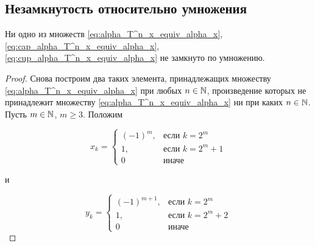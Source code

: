 \subsection{Незамкнутость относительно умножения}

\begin{theorem}
	Ни одно из множеств
	\eqref{eq:alpha_T^n_x_equiv_alpha_x}, \eqref{eq:cap_alpha_T^n_x_equiv_alpha_x}, \eqref{eq:cup_alpha_T^n_x_equiv_alpha_x}
	не замкнуто по умножению.
\end{theorem}

\begin{proof}
	Снова построим два таких элемента, принадлежащих множеству \eqref{eq:alpha_T^n_x_equiv_alpha_x} при любых $n\in\mathbb{N}$,
	произведение которых не принадлежит множеству \eqref{eq:alpha_T^n_x_equiv_alpha_x} ни при каких $n\in\mathbb{N}$.
	Пусть $m\in\mathbb{N}$, $m \geq 3$.
	Положим

	\begin{equation}
		x_k = \begin{cases}
			(-1)^m,  & \mbox{если } k = 2^m     \\
			1,                   & \mbox{если } k = 2^m + 1 \\
			0                    & \mbox{иначе }
		\end{cases}
	\end{equation}

	и

	\begin{equation}
		y_k = \begin{cases}
			(-1)^{m+1},  & \mbox{если } k = 2^m     \\
			1,                   & \mbox{если } k = 2^m + 2 \\
			0                    & \mbox{иначе }
		\end{cases}
	\end{equation}


\end{proof}
